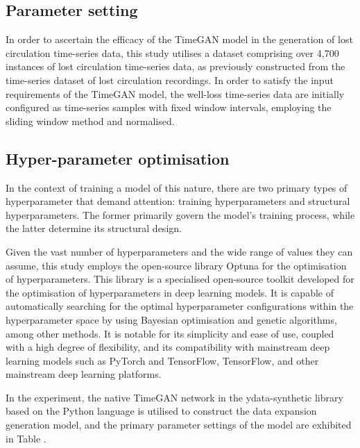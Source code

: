\documentclass[journal,article,submit,pdftex,moreauthors]{Definitions/mdpi}
\begin{document}
\subsection{Parameter setting }

In order to ascertain the efficacy of the TimeGAN model in the generation of lost circulation time-series data, this study utilises a dataset comprising over 4,700 instances of lost circulation time-series data, as previously constructed from the time-series dataset of lost circulation recordings. In order to satisfy the input requirements of the TimeGAN model, the well-loss time-series data are initially configured as time-series samples with fixed window intervals, employing the sliding window method and normalised.

\subsection{Hyper-parameter optimisation}

In the context of training a model of this nature, there are two primary types of hyperparameter that demand attention: training hyperparameters and structural hyperparameters. The former primarily govern the model's training process, while the latter determine its structural design. 

Given the vast number of hyperparameters and the wide range of values they can assume, this study employs the open-source library Optuna for the optimisation of hyperparameters. This library is a specialised open-source toolkit developed for the optimisation of hyperparameters in deep learning models. It is capable of automatically searching for the optimal hyperparameter configurations within the hyperparameter space by using Bayesian optimisation and genetic algorithms, among other methods. It is notable for its simplicity and ease of use, coupled with a high degree of flexibility, and its compatibility with mainstream deep learning models such as PyTorch and TensorFlow, TensorFlow, and other mainstream deep learning platforms.

In the experiment, the native TimeGAN network in the ydata-synthetic library based on the Python language is utilised to construct the data expansion generation model, and the primary parameter settings of the model are exhibited in Table \label{TimeGAN parameter settings}.
\end{document}
